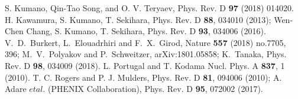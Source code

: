 \documentclass{PoS}
\begin{document}
\begin{thebibliography}{99}
  S. Kumano, Qin-Tao Song, and O. V. Teryaev,  
           Phys. Rev. D {\bf 97} (2018) 014020.
\vspace{-0.20cm}
 H. Kawamura, S. Kumano, T. Sekihara,
                       Phys. Rev. D {\bf 88}, 034010 (2013);
  Wen-Chen Chang, S. Kumano, T. Sekihara,
           Phys. Rev. D {\bf 93}, 034006 (2016).
\vspace{-0.20cm}
V.~D.~Burkert, L.~Elouadrhiri and F.~X.~Girod,
  Nature {\bf 557} (2018) no.7705, 396; 
M.~V.~Polyakov and P.~Schweitzer, arXiv:1801.05858;   
K.~Tanaka, Phys. Rev. D {\bf 98}, 034009 (2018).
\vspace{-0.20cm}
 L. Portugal and T. Kodama
                    Nucl. Phys. A {\bf 837}, 1 (2010).
\vspace{-0.20cm}
 T. C. Rogers and P. J. Mulders, 
                            Phys. Rev. D {\bf 81}, 094006 (2010);
 A. Adare $et al$. (PHENIX Collaboration), Phys. Rev. D {\bf 95}, 072002 (2017).
\vspace{-0.20cm}
\end{thebibliography}
\end{document}
